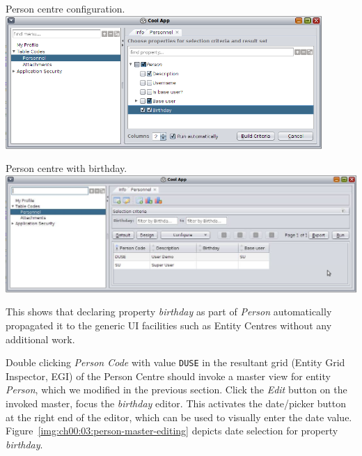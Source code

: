   \begin{image}{Person centre configuration.}{\label{img:ch00:03:person-centre-configuration}}
    \includegraphics[width=0.9\textwidth]{parts/00-part/chapters/02-making-changes/images/07-person-centre-configuration.png}
  \end{image}

  \begin{image}{Person centre with birthday.}{\label{img:ch00:03:person-centre}}
    \includegraphics[width=\textwidth]{parts/00-part/chapters/02-making-changes/images/08-person-centre.png}
  \end{image}

  This shows that declaring property \emph{birthday} as part of \emph{Person} automatically propagated it to the generic UI facilities such as Entity Centres without any additional work.
  
  Double clicking \emph{Person Code} with value \texttt{DUSE} in the resultant grid (Entity Grid Inspector, EGI) of the Person Centre should invoke a master view for entity \emph{Person}, which we modified in the previous section.
  Click the \emph{Edit} button on the invoked master, focus the \emph{birthday} editor.
  This activates the date/picker button at the right end of the editor, which can be used to visually enter the date value.
  Figure~\ref{img:ch00:03:person-master-editing} depicts date selection for property \emph{birthday}.


